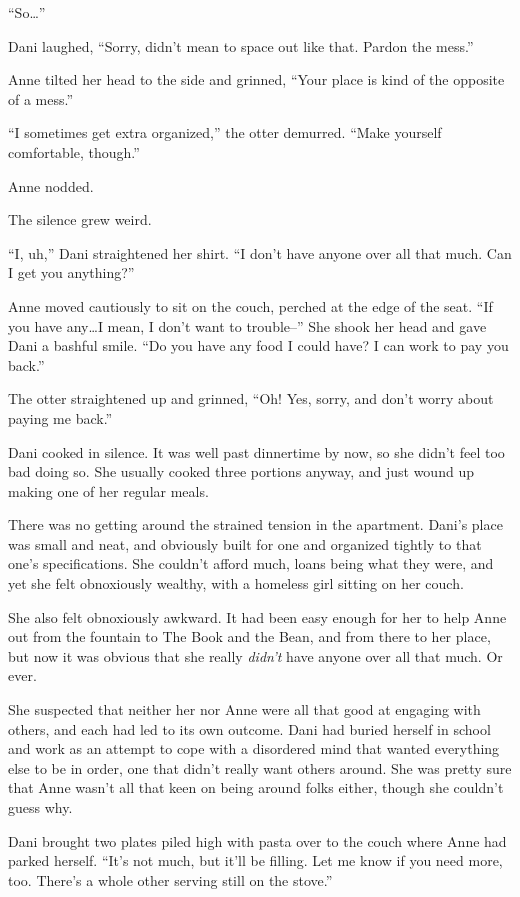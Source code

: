 ``So\ldots{}''

Dani laughed, ``Sorry, didn't mean to space out like that. Pardon the mess.''

Anne tilted her head to the side and grinned, ``Your place is kind of the opposite of a mess.''

``I sometimes get extra organized,'' the otter demurred. ``Make yourself comfortable, though.''

Anne nodded.

The silence grew weird.

``I, uh,'' Dani straightened her shirt. ``I don't have anyone over all that much. Can I get you anything?''

Anne moved cautiously to sit on the couch, perched at the edge of the seat. ``If you have any\ldots{}I mean, I don't want to trouble--'' She shook her head and gave Dani a bashful smile. ``Do you have any food I could have? I can work to pay you back.''

The otter straightened up and grinned, ``Oh! Yes, sorry, and don't worry about paying me back.''

Dani cooked in silence. It was well past dinnertime by now, so she didn't feel too bad doing so. She usually cooked three portions anyway, and just wound up making one of her regular meals.

There was no getting around the strained tension in the apartment. Dani's place was small and neat, and obviously built for one and organized tightly to that one's specifications. She couldn't afford much, loans being what they were, and yet she felt obnoxiously wealthy, with a homeless girl sitting on her couch.

She also felt obnoxiously awkward. It had been easy enough for her to help Anne out from the fountain to The Book and the Bean, and from there to her place, but now it was obvious that she really \emph{didn't} have anyone over all that much. Or ever.

She suspected that neither her nor Anne were all that good at engaging with others, and each had led to its own outcome. Dani had buried herself in school and work as an attempt to cope with a disordered mind that wanted everything else to be in order, one that didn't really want others around. She was pretty sure that Anne wasn't all that keen on being around folks either, though she couldn't guess why.

Dani brought two plates piled high with pasta over to the couch where Anne had parked herself. ``It's not much, but it'll be filling. Let me know if you need more, too. There's a whole other serving still on the stove.''

